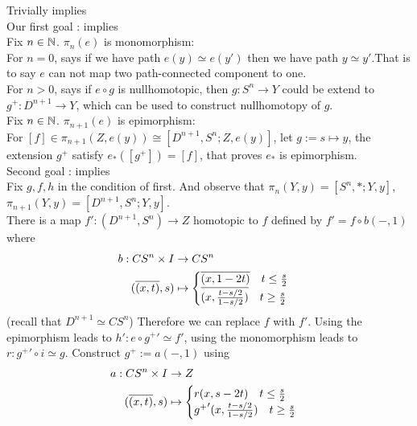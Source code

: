     \begin{prf}
        Trivially  implies \\

        Our first goal :  implies \\

        Fix $n\in \mathbb N$. $\pi_n(e)$ is monomorphism:\\
        For $n = 0$,  says if we have path $e(y) \simeq e(y') $
        then we have path $y \simeq y'$.That is to say
        $e$ can not map two path-connected component to one.\\
        For $n > 0$,  says if $e \circ g$ is nullhomotopic,
        then $g : S^n \to Y$ could be extend to $g^+ : D^{n+1} \to Y$,
        which can be used to construct nullhomotopy of $g$.\\

        Fix $n \in \mathbb N$. $\pi_{n+1}(e)$ is epimorphism:\\
        For $[f] \in \pi_{n+1}(Z,e(y)) \cong [D^{n+1},S^n; Z,e(y)]$,
        let $g := s \mapsto y$, the extension $g^+$ satisfy
        $e_* ([g^+]) = [f]$, that proves $e_*$ is epimorphism.\\

        Second goal :  implies \\

        Fix $g, f, h$ in the condition of  first.
        And observe that
        $\pi_n(Y,y) = [S^n,\ast; Y,y]$, $\pi_{n+1}(Y,y) = [D^{n+1},S^n; Y,y]$.\\
        There is a map $f' : (D^{n+1},S^n) \to Z$ homotopic to $f$
        defined by $f' = f \circ b(-,1)$
        where
        \begin{align*}
            b : CS^n \times I & \to CS^n\\
                (\overline{(x,t)} , s)  & \mapsto
                \begin{cases}
                    \overline{(x,1-2t)} \quad t \leq \frac{s}{2}  \\
                    \overline{(x,\frac{t-s/2}{1-s/2})} \quad t \geq \frac{s}{2}
                \end{cases}
        \end{align*}
        (recall that $D^{n+1} \simeq CS^n $)
        Therefore we can replace $f$ with $f'$.
        Using the epimorphism leads to $h' : e \circ {g^+}' \simeq f'$,
        using the monomorphism leads to $r : {g^+}' \circ i \simeq g $.
        Construct $g^+ := a(-,1) $ using
        \begin{align*}
            a : CS^n \times I & \to Z\\
                (\overline{(x,t)} , s)  & \mapsto
                \begin{cases}
                    r(x, s-2t) \quad t \leq \frac{s}{2}  \\
                    {g^+}'(x,\frac{t-s/2}{1-s/2}) \quad t \geq \frac{s}{2}
                \end{cases}
        \end{align*}


\end{prf}
